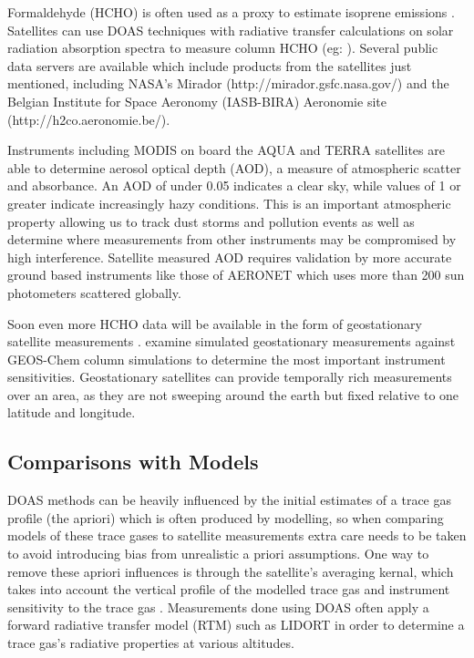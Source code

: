     Formaldehyde (HCHO) is often used as a proxy to estimate isoprene emissions \citep{Marais2012,bauwens2013satellite}.
    Satellites can use DOAS techniques with radiative transfer calculations on solar radiation absorption spectra to measure column HCHO (eg: \citet{Leue2001}).
    Several public data servers are available which include products from the satellites just mentioned, including NASA's Mirador (http://mirador.gsfc.nasa.gov/) and the Belgian Institute for Space Aeronomy (IASB-BIRA) Aeronomie site (http://h2co.aeronomie.be/).

    Instruments including MODIS on board the AQUA and TERRA satellites are able to determine aerosol optical depth (AOD), a measure of atmospheric scatter and absorbance. 
    An AOD of under 0.05 indicates a clear sky, while values of 1 or greater indicate increasingly hazy conditions.
    This is an important atmospheric property allowing us to track dust storms and pollution events as well as determine where measurements from other instruments may be compromised by high interference.
    Satellite measured AOD requires validation by more accurate ground based instruments like those of AERONET which uses more than 200 sun photometers scattered globally. 
  
    Soon even more HCHO data will be available in the form of geostationary satellite measurements \citep{Kwon2017}.
    \cite{Kwon2017} examine simulated geostationary measurements against GEOS-Chem column simulations to determine the most important instrument sensitivities.
    Geostationary satellites can provide temporally rich measurements over an area, as they are not sweeping around the earth but fixed relative to one latitude and longitude.
    
  \subsection{Comparisons with Models}
  
    DOAS methods can be heavily influenced by the initial estimates of a trace gas profile (the apriori) which is often produced by modelling, so when comparing models of these trace gases to satellite measurements extra care needs to be taken to avoid introducing bias from unrealistic a priori assumptions.
    One way to remove these apriori influences is through the satellite's averaging kernal, which takes into account the vertical profile of the modelled trace gas and instrument sensitivity to the trace gas \citep{Eskes2003, Palmer2001}.
    Measurements done using DOAS often apply a forward radiative transfer model (RTM) such as LIDORT in order to determine a trace gas's radiative properties at various altitudes.
  
